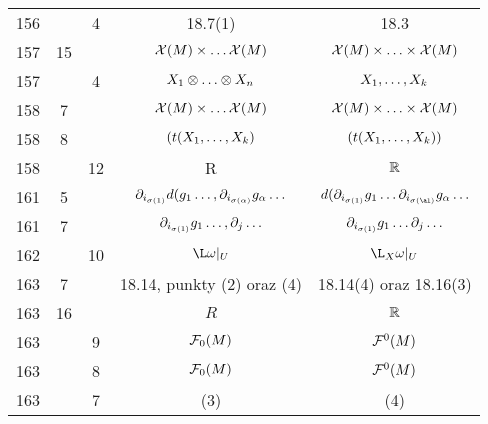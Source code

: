 \documentclass[a4paper,11pt]{article}
\begin{document}
\begin{center}
\begin{tabular}{|c|c|c|c|c|}
    156 & &  4 & 18.7(1) & 18.3 \\
    157 & 15 & & $\mathcal{X}( M ) \times \ldots \mathcal{X}( M )$
           & $\mathcal{X}( M ) \times \ldots \times \mathcal{X}( M )$ \\
    157 & &  4 & $X_{ 1 } \otimes \ldots \otimes X_{ n }$ & $X_{ 1 }, \ldots, X_{ k }$ \\
    158 &  7 & & $\mathcal{X}( M ) \times \ldots \mathcal{X}( M )$
           & $\mathcal{X}( M ) \times \ldots \times \mathcal{X}( M )$ \\
    158 &  8 & & $( t( X_{ 1 }, \ldots, X_{ k } )$
           & $( t( X_{ 1 }, \ldots, X_{ k } ) )$ \\
    158 & & 12 & R & $\mathbb{R}$ \\
    161 &  5 & & $\partial_{ i_{ \sigma( 1 ) } } d( g_{ 1 } \ldots,
                 \partial_{ i_{ \sigma( \alpha ) } } g_{ \alpha } \ldots$
           & $d( \partial_{ i_{ \sigma( 1 ) } } g_{ 1 } \ld
             \partial_{ i_{ \sigma( \al ) } } g_{ \alpha } \ld$ \\
    161 &  7 & & $\partial_{ i_{ \sigma( 1 ) } } g_{ 1 } \ldots, \partial_{ j }\ldots$
           & $\partial_{ i_{ \sigma( 1 ) } } g_{ 1 } \ldots \partial_{ j }\ldots$ \\
    162 & & 10 & $\L\omega |_{ U }$ & $\L_{ X }\omega|_{ U } $ \\
    163 &  7 & & 18.14, punkty (2) oraz (4) & 18.14(4) oraz 18.16(3) \\
    163 & 16 & & $R$ & $\mathbb{R}$ \\
    163 & &  9 & $\mathcal{F}_{ 0 }( M )$ & $\mathcal{F}^{ 0 }( M )$ \\
    163 & &  8 & $\mathcal{F}_{ 0 }( M )$ & $\mathcal{F}^{ 0 }( M )$ \\
    163 & &  7 & (3) & (4) \\
    \hline
  \end{tabular}


\end{center}
\end{document}

